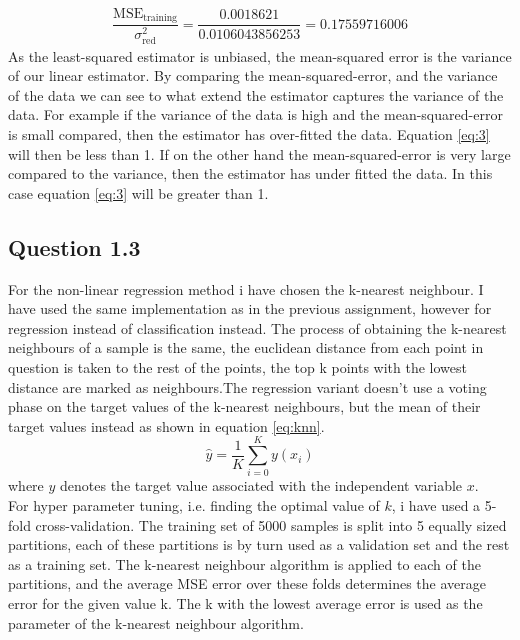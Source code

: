 \documentclass{article}
\begin{document}
\begin{align}
\dfrac{\text{MSE}_{\text{training}}}{\sigma^2_{\text{red}}} =
\dfrac{0.0018621}{0.0106043856253} = 0.17559716006
\label{eq:3}
\end{align}
As the least-squared estimator is unbiased, the mean-squared error is the variance of our linear estimator. By comparing the mean-squared-error, and the variance of the data we can see to what extend the estimator captures the variance of the data. For example if the variance of the data is high and the mean-squared-error is small compared, then the estimator has over-fitted the data. Equation \eqref{eq:3} will then be less than 1. If on the other hand the mean-squared-error is very large compared to the variance, then the estimator has under fitted the data. In this case equation \eqref{eq:3} will be greater than 1.
\subsection{Question 1.3}
For the non-linear regression method i have chosen the k-nearest neighbour. I have used the same implementation as in the previous assignment, however for regression instead of classification instead. The process of obtaining the k-nearest neighbours of a sample is the same, the euclidean distance from each point in question is taken to the rest of the points, the top k points with the lowest distance are marked as neighbours.The regression variant doesn't use a voting phase 
on the target values of the k-nearest neighbours, but the mean of their target values instead as shown in equation \eqref{eq:knn}.
\begin{equation}
\hat{y} =  \dfrac{1}{K} \sum\limits_{i=0}^K y(x_i)
\label{eq:knn}
\end{equation}
where $y$ denotes the target value associated with the independent variable $x$. \\
For hyper parameter tuning, i.e. finding the optimal value of $k$, i have used a 5-fold cross-validation. The training set of 5000 samples is split into 5 equally sized partitions, each of these partitions is by turn used as a validation set and the rest as a training set. The k-nearest neighbour algorithm is applied to each of the partitions, and the average MSE error over these folds determines the average error for the given value k. The k with the lowest average error is used as the parameter of the k-nearest neighbour algorithm.
\\
\end{document}
